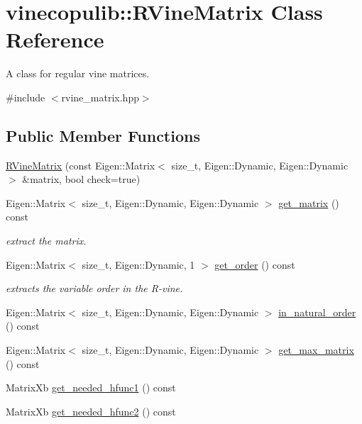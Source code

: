 \hypertarget{classvinecopulib_1_1_r_vine_matrix}{}\section{vinecopulib\+:\+:R\+Vine\+Matrix Class Reference}
\label{classvinecopulib_1_1_r_vine_matrix}


A class for regular vine matrices.  




{\ttfamily \#include $<$rvine\+\_\+matrix.\+hpp$>$}

\subsection*{Public Member Functions}
\begin{DoxyCompactItemize}
\item 
\hyperlink{classvinecopulib_1_1_r_vine_matrix_a966316e211937ae11e840ef7540a492f}{R\+Vine\+Matrix} (const Eigen\+::\+Matrix$<$ size\+\_\+t, Eigen\+::\+Dynamic, Eigen\+::\+Dynamic $>$ \&matrix, bool check=true)
\item 
Eigen\+::\+Matrix$<$ size\+\_\+t, Eigen\+::\+Dynamic, Eigen\+::\+Dynamic $>$ \hyperlink{classvinecopulib_1_1_r_vine_matrix_a37c79233fca1e56e1535cbb37f8d3177}{get\+\_\+matrix} () const \hypertarget{classvinecopulib_1_1_r_vine_matrix_a37c79233fca1e56e1535cbb37f8d3177}{}\label{classvinecopulib_1_1_r_vine_matrix_a37c79233fca1e56e1535cbb37f8d3177}

\begin{DoxyCompactList}\small\item\em extract the matrix. \end{DoxyCompactList}\item 
Eigen\+::\+Matrix$<$ size\+\_\+t, Eigen\+::\+Dynamic, 1 $>$ \hyperlink{classvinecopulib_1_1_r_vine_matrix_a71554c734c3cbb4c066c1f17fe94a284}{get\+\_\+order} () const \hypertarget{classvinecopulib_1_1_r_vine_matrix_a71554c734c3cbb4c066c1f17fe94a284}{}\label{classvinecopulib_1_1_r_vine_matrix_a71554c734c3cbb4c066c1f17fe94a284}

\begin{DoxyCompactList}\small\item\em extracts the variable order in the R-\/vine. \end{DoxyCompactList}\item 
Eigen\+::\+Matrix$<$ size\+\_\+t, Eigen\+::\+Dynamic, Eigen\+::\+Dynamic $>$ \hyperlink{classvinecopulib_1_1_r_vine_matrix_a4e63d8b01e1d89284ca28192676b8a3f}{in\+\_\+natural\+\_\+order} () const 
\item 
Eigen\+::\+Matrix$<$ size\+\_\+t, Eigen\+::\+Dynamic, Eigen\+::\+Dynamic $>$ \hyperlink{classvinecopulib_1_1_r_vine_matrix_aef8bbe14451d023e1c9c113e3812f574}{get\+\_\+max\+\_\+matrix} () const 
\item 
Matrix\+Xb \hyperlink{classvinecopulib_1_1_r_vine_matrix_a6303fc1f643fdf793c867ca7e08e42bc}{get\+\_\+needed\+\_\+hfunc1} () const 
\item 
Matrix\+Xb \hyperlink{classvinecopulib_1_1_r_vine_matrix_a7ac32cf10a966ba567142e9b36106746}{get\+\_\+needed\+\_\+hfunc2} () const 
\end{DoxyCompactItemize}
